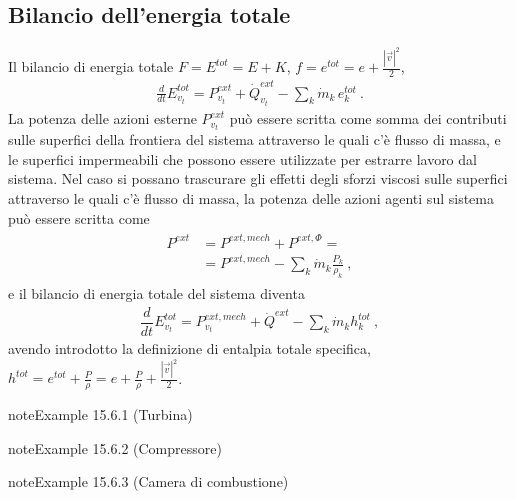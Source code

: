 \documentclass[letterpaper,10pt,italian]{jupyterBook}
\begin{document}
\subsection{Bilancio dell’energia totale}
\label{\detokenize{ch/thermodynamics/principles-open:bilancio-dell-energia-totale}}\label{\detokenize{ch/thermodynamics/principles-open:physics-hs-thermodynamics-foundation-principles-open-total-energy}}
\sphinxAtStartPar
Il bilancio di energia totale \(F = E^{tot} = E + K\), \(f = e^{tot} = e + \frac{|\vec{v}|^2}{2}\),
\begin{equation*}
\begin{split}\frac{d}{dt} E^{tot}_{v_t} = P^{ext}_{v_t}  + \dot{Q}^{ext}_{v_t}  - \sum_k \dot{m}_k \, e^{tot}_k \ .\end{split}
\end{equation*}
\sphinxAtStartPar
La potenza delle azioni esterne \(P^{ext}_{v_t}\) può essere scritta come somma dei contributi sulle superfici della frontiera del sistema attraverso le quali c’è flusso di massa, e le superfici impermeabili che possono essere utilizzate per estrarre lavoro dal sistema. Nel caso si possano trascurare gli effetti degli sforzi viscosi sulle superfici attraverso le quali c’è flusso di massa, la potenza delle azioni agenti sul sistema può essere scritta come
\begin{equation*}
\begin{split}\begin{aligned}
  P^{ext} & = P^{ext,mech} + P^{ext,\Phi} = \\
          & = P^{ext,mech} - \sum_{k} \dot{m}_k \frac{P_k}{\rho_k} \ , 
\end{aligned}\end{split}
\end{equation*}
\sphinxAtStartPar
e il bilancio di energia totale del sistema diventa
\begin{equation*}
\begin{split}\dfrac{d}{dt} E^{tot}_{v_t} = P^{ext,mech}_{v_t} + \dot{Q}^{ext} - \sum_k \dot{m}_k h^{tot}_k \ ,\end{split}
\end{equation*}
\sphinxAtStartPar
avendo introdotto la definizione di entalpia totale specifica, \(h^{tot} = e^{tot} + \frac{P}{\rho} = e + \frac{P}{\rho} + \frac{|\vec{v}|^2}{2}\).
\label{ch/thermodynamics/principles-open:thermodynamics:principles:open:ex:turbine}
\begin{sphinxadmonition}{note}{Example 15.6.1 (Turbina)}


\end{sphinxadmonition}
\label{ch/thermodynamics/principles-open:thermodynamics:principles:open:ex:compressor}
\begin{sphinxadmonition}{note}{Example 15.6.2 (Compressore)}


\end{sphinxadmonition}
\label{ch/thermodynamics/principles-open:thermodynamics:principles:open:ex:comb-chamber}
\begin{sphinxadmonition}{note}{Example 15.6.3 (Camera di combustione)}


\end{sphinxadmonition}
\end{document}
